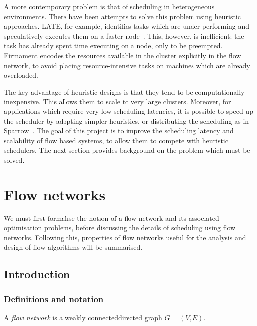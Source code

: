 A more contemporary problem is that of scheduling in heterogeneous environments. There have been attempts to solve this problem using heuristic approaches. LATE, for example, identifies tasks which are under-performing and speculatively executes them on a faster node~\cite{Zaharia:2008}. This, however, is inefficient: the task has already spent time executing on a node, only to be preempted. Firmament encodes the resources available in the cluster explicitly in the flow network, to avoid placing resource-intensive tasks on machines which are already overloaded.

The key advantage of heuristic designs is that they tend to be computationally inexpensive. This allows them to scale to very large clusters. Moreover, for applications which require very low scheduling latencies, it is possible to speed up the scheduler by adopting simpler heuristics, or distributing the scheduling as in Sparrow~\cite{Ousterhout:2013}. The goal of this project is to improve the scheduling latency and scalability of flow based systems, to allow them to compete with heuristic schedulers. The next section provides background on the problem which must be solved.

\section{Flow networks} \label{sec:prep-flow}

We must first formalise the notion of a flow network and its associated optimisation problems, before discussing the details of scheduling using flow networks. Following this, properties of flow networks useful for the analysis and design of flow algorithms will be summarised.

\subsection{Introduction}


\subsubsection{Definitions and notation}

A \emph{flow network} is a weakly connected\footnotemark directed graph $G=(V,E)$.

